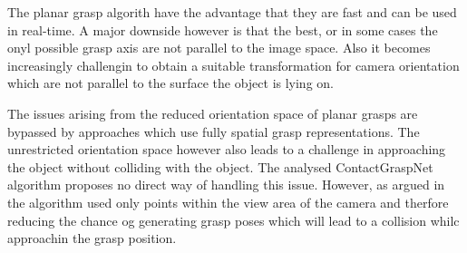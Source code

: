 The planar grasp algorith have the advantage that they are fast and can be used in real-time.
A major downside however is that the best, or in some cases the onyl possible grasp axis are not parallel to the image space.
Also it becomes increasingly challengin to obtain a suitable transformation for camera orientation which are not parallel to the surface the object is lying on.

The issues arising from the reduced orientation space of planar grasps are bypassed by approaches which use fully spatial grasp representations.
The unrestricted orientation space however also leads to a challenge in approaching the object without colliding with the object.
The analysed ContactGraspNet algorithm proposes no direct way of handling this issue.
However, as argued in \cite{} the algorithm used only points within the view area of the camera and therfore reducing the chance og generating grasp poses which will
lead to a collision whilc approachin the grasp position.



